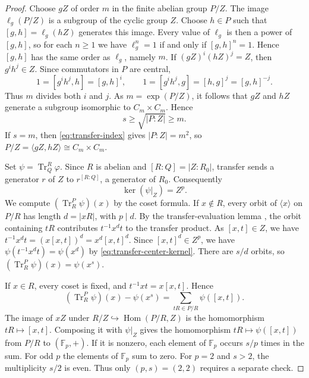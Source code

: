 \documentclass[11pt,a4paper]{article}
\theoremstyle{definition}
\theoremstyle{remark}
\numberwithin{equation}{section}
\newcommand{\Fp}{\mathbb{F}_p}
\DeclareMathOperator{\Hom}{Hom}
\begin{document}
\begin{proof}
		Choose $gZ$ of order $m$ in the finite abelian group $P/Z$.
		The image $\ell_g(P/Z)$ is a subgroup of the cyclic group $Z$.
		Choose $h\in P$ such that $[g,h]=\ell_g(hZ)$ generates this image.
		Every value of $\ell_g$ is then a power of $[g,h]$, so for each
		$n\ge1$ we have $\ell_g^n=1$ if and only if $[g,h]^n=1$.
		Hence $[g,h]$ has the same order as $\ell_g$, namely $m$.
		If $(gZ)^i(hZ)^j=Z$, then $g^ih^j\in Z$. Since commutators in $P$ are central,
		\[
		1=[g^ih^j,h]=[g,h]^i,\qquad
		1=[g^ih^j,g]=[h,g]^j=[g,h]^{-j}.
		\]
		Thus $m$ divides both $i$ and $j$. As $m=\exp(P/Z)$, it follows that
		$gZ$ and $hZ$ generate a subgroup isomorphic to $C_m\times C_m$.
		Hence
		\begin{equation}\label{eq:transfer-index}
			s\ge\sqrt{|P:Z|}\ge m.
		\end{equation}
		If $s=m$, then \eqref{eq:transfer-index} gives $|P:Z|=m^2$, so
		$P/Z=\langle gZ,hZ\rangle\cong C_m\times C_m$.
		
		Set $\psi=\operatorname{Tr}_{Q}^R\varphi$.
		Since $R$ is abelian and $[R:Q]=|Z:R_0|$, transfer sends a generator
		$r$ of $Z$ to $r^{[R:Q]}$, a generator of $R_0$.
		Consequently
		\begin{equation}\label{eq:transfer-center-kernel}
			\ker(\psi|_Z)=Z^p.
		\end{equation}
		We compute $(\operatorname{Tr}_R^P\psi)(x)$ by the coset formula.
		If $x\notin R$, every orbit of $\langle x\rangle$ on $P/R$ has
		length $d=|xR|$, with $p\mid d$. By the transfer-evaluation lemma
		\cite[Lemma~5.5(b)]{Isaacs2008},
		the orbit containing $tR$ contributes $t^{-1}x^dt$ to the transfer product.
		As $[x,t]\in Z$, we have $t^{-1}x^dt=(x[x,t])^d=x^d[x,t]^d$.
		Since $[x,t]^d\in Z^p$,
		we have $\psi(t^{-1}x^dt)=\psi(x^d)$ by \eqref{eq:transfer-center-kernel}.
		There are $s/d$ orbits, so $(\operatorname{Tr}_R^P\psi)(x)=\psi(x^s)$.
		
		If $x\in R$, every coset is fixed, and $t^{-1}xt=x[x,t]$. Hence
		\[
		(\operatorname{Tr}_R^P\psi)(x)-\psi(x^s)
		=\sum_{tR\in P/R}\psi([x,t]).
		\]
		The image of $xZ$ under $R/Z\hookrightarrow\Hom(P/R,Z)$ is the homomorphism
		$tR\mapsto[x,t]$. Composing it with $\psi|_Z$ gives the homomorphism
		$tR\mapsto\psi([x,t])$ from $P/R$ to $(\Fp,+)$.
		If it is nonzero, each element of $\Fp$ occurs $s/p$ times in the sum.
		For odd $p$ the elements of $\Fp$ sum to zero. For $p=2$ and $s>2$,
		the multiplicity $s/2$ is even. Thus only $(p,s)=(2,2)$ requires a separate check.
		

\end{proof}
\end{document}

